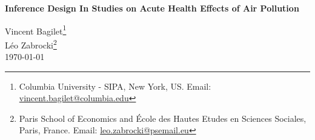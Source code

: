 \documentclass[12pt]{article}
\begin{document}



\begin{titlepage}
\vspace*{-2cm}
\begin{flushleft}
\Huge{}\selectfont\textbf{Inference Design In Studies on Acute Health Effects of Air Pollution}
\end{flushleft}
\vspace*{0.1cm} 
\begin{flushleft}
{\large
Vincent Bagilet\footnote{Columbia University - SIPA, New York, US. Email: \url{vincent.bagilet@columbia.edu}}\\[3pt] 
Léo Zabrocki\footnote{ Paris School of Economics and
École des Hautes Etudes en Sciences Sociales, Paris, France. Email: \url{leo.zabrocki@psemail.eu}}
\\ [0.3cm] 
\normalsize{\today} \\
}

\end{flushleft}


\begin{abstract}
\small
\noindent 


We explore statistical power issues of various empirical strategies implemented to estimate the short-term health effect of air pollution. Through an extensive literature review, we retrieve the estimates and standard errors of nearly all studies published on this topic, which rely both on standard outcomes regressions and causal inference methods. We find that a non-negligible share of studies may suffer from low power issues and could thereby exaggerate effect sizes. The analysis of published results highlights potential shortcomings of the literature but does not enable to precisely identify drivers of theses issues. We therefore run realistic simulations to investigate how statistical power varies with the treatment effect size, the number of observations, the proportion of treated units as well as the distribution of the outcome. Instrumental variable estimates, when statistically significant, are more likely to overestimate true effect sizes than naive estimates. Researchers should also pay attention to the number of treated units and the average count of health outcomes as they are important drivers of statistical power and may lead to greatly overestimated true effect sizes.

\bigskip
\end{abstract}
\setcounter{page}{0}
\thispagestyle{empty}
\end{titlepage}
\pagebreak \newpage
\end{document}
